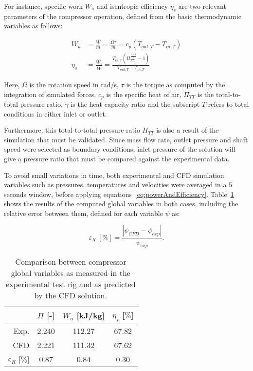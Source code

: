 For instance, specific work $W_u$ and isentropic efficiency $\eta_s$ are two relevant parameters of the compressor operation, defined from the basic thermodynamic variables as follows:

\begin{align}\label{eq:powerAndEfficiency}
W_u&=\frac{\dot{W}}{\dot{m}}=\frac{\Omega\tau}{\dot{m}}=c_p(T_{out,T}-T_{in,T}) \nonumber \\
\eta_s &= \frac{\dot{W}_{s}}{\dot{W}}=\frac{T_{in,T}\left(\varPi_{TT}^\frac{\gamma-1}{\gamma}-1\right)}{T_{out,T}-T_{in,T}}
\end{align}

Here, $\Omega$ is the rotation speed in rad/s, $\tau$ is the torque as computed by the integration of simulated forces, $c_p$ is the specific heat of air, $\varPi_{TT}$ is the total-to-total pressure ratio, $\gamma$ is the heat capacity ratio and the subscript $T$ refers to total conditions in either inlet or outlet.

Furthermore, this total-to-total pressure ratio $\varPi_{TT}$ is also a result of the simulation that must be validated. Since mass flow rate, outlet pressure and shaft speed were selected as boundary conditions, inlet pressure of the solution will give a pressure ratio that must be compared against the experimental data. 

To avoid small variations in time, both experimental and CFD simulation variables such as pressures, temperatures and velocities were averaged in a 5 seconds window, before applying equations~\ref{eq:powerAndEfficiency}. Table~\ref{tab:cfd_globalVariables} shows the results of the computed global variables in both cases, including the relative error between them, defined for each variable $\psi$ as:

\begin{equation}\label{eq:relative_error_cfd}
	\varepsilon_R\;[\%]=\frac{\left| \psi_{CFD}-\psi_{exp} \right|}{\psi_{exp}}.
\end{equation}

\begin{table}[htb]
\centering
\caption[Validation of global variables]{Comparison between compressor global variables as measured in the experimental test rig and as predicted by the CFD solution.}
\footnotesize
	\begin{tabular}{rccc}
	\toprule
	 & $\varPi$ [-] & $W_u$ [kJ/kg] & $\eta_s$ [$\%$] \\\midrule
	Exp. & 2.240 & 112.27 & 67.82  \\
	CFD & 2.221 & 111.32 & 67.62  \\\midrule
	$\varepsilon_R$ [\%] & 0.87 & 0.84 & 0.30  \\ \bottomrule
	\end{tabular}
\label{tab:cfd_globalVariables}
\end{table}

